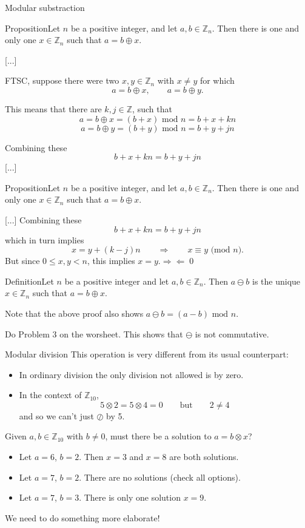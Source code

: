 \documentclass{beamer}
\def\bl[#1]#2{\begin{block}{#1}#2\end{block}}
\def\itemb{\begin{itemize}}
\def\iteme{\end{itemize}}
\begin{document}
\begin{frame}{Modular substraction}
\bl[Proposition]{Let $n$ be a positive integer, and let $a,b\in\mathbb{Z}_n$. Then there is one and only one $x\in\mathbb{Z}_n$ such that $a=b\oplus x$.}
[...]

FTSC, suppose there were two $x,y\in\mathbb{Z}_n$ with $x\neq y$ for which\vspace{-0.2cm}
\[
a=b\oplus x,\qquad a=b\oplus y.
\]\vspace{-0.6cm}

This means that there are $k,j\in\mathbb{Z}$, such that\vspace{-0.2cm}
\[
a=b\oplus x = (b+x)\textrm{ mod } n=b+x+kn
\]\vspace{-0.6cm}
\[
a=b\oplus y = (b+y)\textrm{ mod } n=b+y+jn
\]\vspace{-0.6cm}

Combining these\vspace{-0.2cm}
\[
b+x+kn=b+y+jn
\]
[...]
\end{frame}

\begin{frame}
\bl[Proposition]{Let $n$ be a positive integer, and let $a,b\in\mathbb{Z}_n$. Then there is one and only one $x\in\mathbb{Z}_n$ such that $a=b\oplus x$.}
[...]
Combining these\vspace{-0.2cm}
\[
b+x+kn=b+y+jn
\]
which in turn implies
\[
x=y+(k-j)n\qquad\Rightarrow\qquad  x\equiv y \textrm{ (mod $n$)}.
\]
But since $0\leq x,y<n$, this implies $x=y$.$\Rightarrow\Leftarrow$\qed

\bl[Definition]{Let $n$ be a positive integer and let $a,b\in\mathbb{Z}_n$. Then $a\ominus b$ is the unique $x\in\mathbb{Z}_n$ such that $a=b\oplus x$.}
Note that the above proof also shows $a\ominus b=(a-b)\textrm{ mod }n$.
\end{frame}

\begin{frame}
\center Do Problem 3 on the worsheet. This shows that $\ominus$ is not commutative.
\end{frame}

\begin{frame}{Modular division}
This operation is very different from its usual counterpart:
\itemb
\item In ordinary division the only division not allowed is by zero.
\item In the context of $\mathbb{Z}_{10}$,
\[
5\otimes 2=5\otimes 4=0\qquad\textrm{but}\qquad 2\neq 4
\]
and so we can't just $\oslash$ by 5.
\iteme
Given $a,b\in\mathbb{Z}_{10}$ with $b\neq 0$, must there be a solution to $a=b\otimes x$?
\itemb
\item Let $a=6$, $b=2$. Then $x=3$ and $x=8$ are both solutions.
\item Let $a=7$, $b=2$. There are no solutions (check all options).
\item Let $a=7$, $b=3$. There is only one solution $x=9$.
\iteme
\center\color{red} We need to do something more elaborate!\color{black}
\end{frame}
\end{document}
